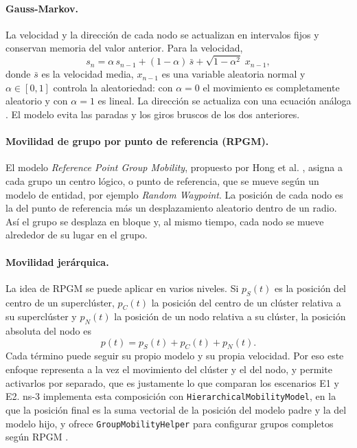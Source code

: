 \paragraph{Gauss-Markov.} La velocidad y la dirección de cada nodo se actualizan en
intervalos fijos y conservan memoria del valor anterior. Para la velocidad,
\[
s_n = \alpha\, s_{n-1} + (1 - \alpha)\, \bar{s} + \sqrt{1 - \alpha^2}\; x_{n-1},
\]
donde $\bar{s}$ es la velocidad media, $x_{n-1}$ es una variable aleatoria normal y
$\alpha \in [0, 1]$ controla la aleatoriedad: con $\alpha = 0$ el movimiento es
completamente aleatorio y con $\alpha = 1$ es lineal. La dirección se actualiza con una
ecuación análoga \cite{camp2002survey,liang1999predictive}. El modelo evita las paradas
y los giros bruscos de los dos anteriores.

\paragraph{Movilidad de grupo por punto de referencia (RPGM).} El modelo
\emph{Reference Point Group Mobility}, propuesto por Hong et al. \cite{hong1999group},
asigna a cada grupo un centro lógico, o punto de referencia, que se mueve según un
modelo de entidad, por ejemplo \emph{Random Waypoint}. La posición de cada nodo es la
del punto de referencia más un desplazamiento aleatorio dentro de un radio. Así el grupo
se desplaza en bloque y, al mismo tiempo, cada nodo se mueve alrededor de su lugar en el
grupo.

\paragraph{Movilidad jerárquica.} La idea de RPGM se puede aplicar en varios niveles.
Si $p_S(t)$ es la posición del centro de un superclúster, $p_C(t)$ la posición del
centro de un clúster relativa a su superclúster y $p_N(t)$ la posición de un nodo
relativa a su clúster, la posición absoluta del nodo es
\[
p(t) = p_S(t) + p_C(t) + p_N(t).
\]
Cada término puede seguir su propio modelo y su propia velocidad. Por eso este enfoque
representa a la vez el movimiento del clúster y el del nodo, y permite activarlos por
separado, que es justamente lo que comparan los escenarios E1 y E2. ns-3 implementa esta
composición con \texttt{HierarchicalMobilityModel}, en la que la posición final es la
suma vectorial de la posición del modelo padre y la del modelo hijo, y ofrece
\texttt{GroupMobilityHelper} para configurar grupos completos según RPGM
\cite{ns3mobility}.

